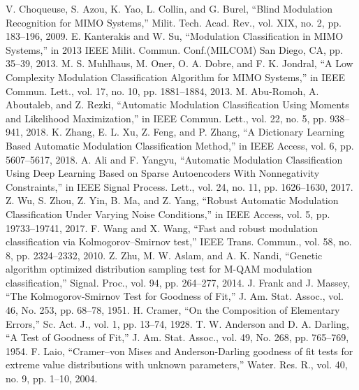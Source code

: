\documentclass[conference]{IEEEtran}
\begin{document}
\begin{thebibliography}{00}

V. Choqueuse, S. Azou, K. Yao, L. Collin, and G. Burel, ``Blind Modulation Recognition for MIMO Systems,'' Milit. Tech. Acad. Rev., vol. XIX, no. 2, pp. 183--196, 2009.
E. Kanterakis and W. Su, ``Modulation Classification in MIMO Systems,'' in 2013 IEEE Milit. Commun. Conf.(MILCOM) San Diego, CA, pp. 35--39, 2013.
M. S. Muhlhaus, M. Oner, O. A. Dobre, and F. K. Jondral, ``A Low Complexity Modulation Classification Algorithm for MIMO Systems,'' in IEEE Commun. Lett., vol. 17, no. 10, pp. 1881--1884, 2013.
M. Abu-Romoh, A. Aboutaleb, and Z. Rezki, ``Automatic Modulation Classification Using Moments and Likelihood Maximization,'' in IEEE Commun. Lett., vol. 22, no. 5, pp. 938--941, 2018.
K. Zhang, E. L. Xu, Z. Feng, and P. Zhang, ``A Dictionary Learning Based Automatic Modulation Classification Method,'' in IEEE Access, vol. 6, pp. 5607--5617, 2018.
A. Ali and F. Yangyu, ``Automatic Modulation Classification Using Deep Learning Based on Sparse Autoencoders With Nonnegativity Constraints,'' in IEEE Signal Process. Lett., vol. 24, no. 11, pp. 1626--1630, 2017.
Z. Wu, S. Zhou, Z. Yin, B. Ma, and Z. Yang, ``Robust Automatic Modulation Classification Under Varying Noise Conditions,'' in IEEE Access, vol. 5, pp. 19733--19741, 2017.
F. Wang and X. Wang, ``Fast and robust modulation classification via Kolmogorov–Smirnov test,'' IEEE Trans. Commun., vol. 58, no. 8, pp. 2324--2332, 2010.
Z. Zhu, M. W. Aslam, and A. K. Nandi, ``Genetic algorithm optimized distribution sampling test for M-QAM modulation classification,'' Signal. Proc., vol. 94, pp. 264--277, 2014.
J. Frank and J. Massey, ``The Kolmogorov-Smirnov Test for Goodness of Fit,'' J. Am. Stat. Assoc., vol. 46, No. 253, pp. 68--78, 1951.
 H. Cramer, ``On the Composition of Elementary Errors,'' Sc. Act. J., vol. 1, pp. 13--74, 1928.
T. W. Anderson and D. A. Darling, ``A Test of Goodness of Fit,'' J. Am. Stat. Assoc., vol. 49, No. 268, pp. 765--769, 1954.
F. Laio, ``Cramer--von Mises and Anderson-Darling goodness of fit tests for extreme value distributions with unknown parameters,'' Water. Res. R., vol. 40, no. 9, pp. 1--10, 2004.
\end{thebibliography}

%
\end{document}
